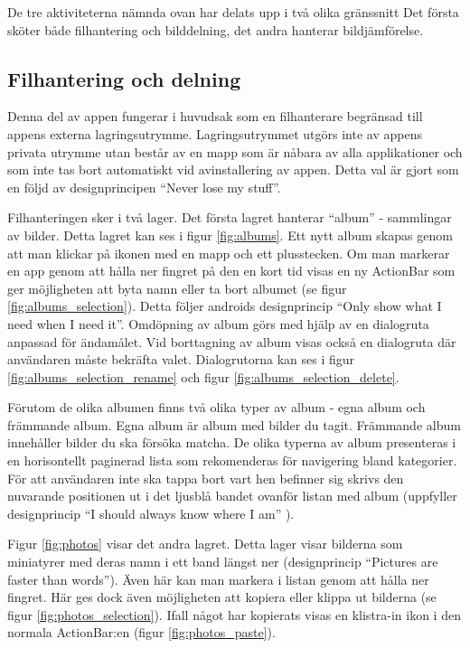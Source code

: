 \documentclass[11px, a4paper]{article}
\begin{document}
	De tre aktiviteterna nämnda ovan har delats upp i två olika gränssnitt Det första sköter både filhantering och bilddelning, det andra hanterar bildjämförelse.


\subsection{Filhantering och delning}

	Denna del av appen fungerar i huvudsak som en filhanterare begränsad till appens externa lagringsutrymme. Lagringsutrymmet utgörs inte av appens privata utrymme utan består av en mapp som är nåbara av alla applikationer och som inte tas bort automatiskt vid avinstallering av appen. Detta val är gjort som en följd av designprincipen ``Never lose my stuff''\cite{Principles}.

	Filhanteringen sker i två lager. Det första lagret hanterar ``album'' - sammlingar av bilder. Detta lagret kan ses i figur \ref{fig:albums}. Ett nytt album skapas genom att man klickar på ikonen med en mapp och ett plusstecken. Om man markerar en app genom att hålla ner fingret på den en kort tid visas en ny ActionBar\cite{ContextActionBar} som ger möjligheten att byta namn eller ta bort albumet (se figur \ref{fig:albums_selection}). Detta följer androids designprincip ``Only show what I need when I need it''\cite{Principles}. Omdöpning av album görs med hjälp av en dialogruta anpassad för ändamålet. Vid borttagning av album visas också en dialogruta där användaren måste bekräfta valet\cite{Dialogs}. Dialogrutorna kan ses i figur \ref{fig:albums_selection_rename} och figur \ref{fig:albums_selection_delete}.

	Förutom de olika albumen finns två olika typer av album - egna album och främmande album. Egna album är album med bilder du tagit. Främmande album innehåller bilder du ska försöka matcha. De olika typerna av album presenteras i en horisontellt paginerad lista som rekomenderas för navigering bland kategorier\cite{HorizontalPaging}. För att användaren inte ska tappa bort vart hen befinner sig skrivs den nuvarande positionen ut i det ljusblå bandet ovanför listan med album (uppfyller designprincip ``I should always know where I am''\cite{Principles} ).

	Figur \ref{fig:photos} visar det andra lagret. Detta lager visar bilderna som miniatyrer med deras namn i ett band längst ner (designprincip ``Pictures are faster than words''\cite{Principles}). Även här kan man markera i listan genom att hålla ner fingret. Här ges dock även möjligheten att kopiera eller klippa ut bilderna (se figur \ref{fig:photos_selection}). Ifall något har kopierats visas en klistra-in ikon i den normala ActionBar:en (figur \ref{fig:photos_paste}).
\end{document}

